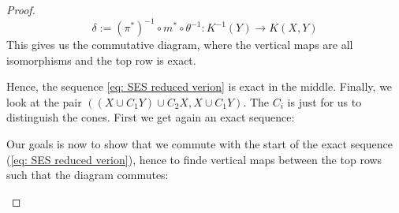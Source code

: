 \begin{proof}
\begin{equation*}
		\delta:=(\pi^*)^{-1}\circ m^*\circ \theta^{-1}: K^{-1}(Y)\to K(X,Y)
	\end{equation*}
	This gives us the commutative diagram, where the vertical maps are all isomorphisms and the top row is exact.
	\begin{center}
		    \end{center}
	Hence, the sequence \ref{eq: SES reduced verion} is exact in the middle.
	Finally, we look at the pair $((X\cup C_1Y)\cup C_2X,X\cup C_1Y)$. The $C_i$ is just for us to distinguish the cones. First we get again an exact sequence:
	\begin{center}
	\end{center}
	Our goals is now to show that we commute with the start of the exact sequence (\ref{eq: SES reduced verion}), hence to finde vertical maps between the top rows such that the diagram commutes:
	\begin{center}

\end{center}
\end{proof}
